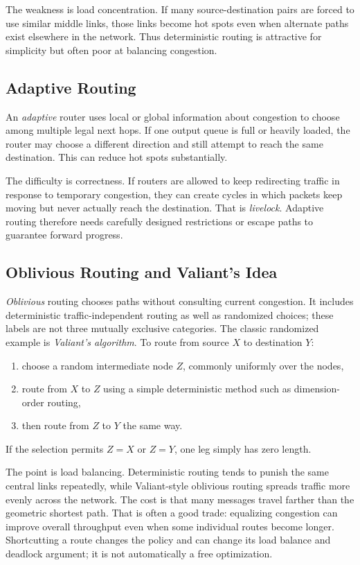 The weakness is load concentration.
If many source-destination pairs are forced to use similar middle links, those links become hot spots even when alternate paths exist elsewhere in the network.
Thus deterministic routing is attractive for simplicity but often poor at balancing congestion.

\subsection{Adaptive Routing}\label{subsec:pin-adaptive-routing}
An \textit{adaptive} router uses local or global information about congestion to choose among multiple legal next hops.
If one output queue is full or heavily loaded, the router may choose a different direction and still attempt to reach the same destination.
This can reduce hot spots substantially.

The difficulty is correctness.
If routers are allowed to keep redirecting traffic in response to temporary congestion, they can create cycles in which packets keep moving but never actually reach the destination.
That is \textit{livelock}.
Adaptive routing therefore needs carefully designed restrictions or escape paths to guarantee forward progress.

\subsection{Oblivious Routing and Valiant's Idea}\label{subsec:pin-oblivious-routing}
\textit{Oblivious} routing chooses paths without consulting current congestion.
It includes deterministic traffic-independent routing as well as randomized choices; these labels are not three mutually exclusive categories.
The classic randomized example is \textit{Valiant's algorithm}.
To route from source $X$ to destination $Y$:
\begin{enumerate}
    \item choose a random intermediate node $Z$, commonly uniformly over the nodes,
    \item route from $X$ to $Z$ using a simple deterministic method such as dimension-order routing,
    \item then route from $Z$ to $Y$ the same way.
\end{enumerate}
If the selection permits $Z=X$ or $Z=Y$, one leg simply has zero length.

The point is load balancing.
Deterministic routing tends to punish the same central links repeatedly, while Valiant-style oblivious routing spreads traffic more evenly across the network.
The cost is that many messages travel farther than the geometric shortest path.
That is often a good trade: equalizing congestion can improve overall throughput even when some individual routes become longer.
Shortcutting a route changes the policy and can change its load balance and deadlock argument; it is not automatically a free optimization.



